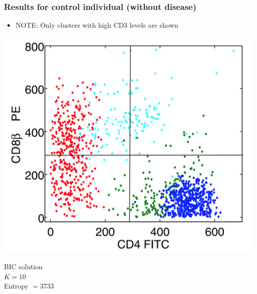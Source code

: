 \documentclass[mathserif,compress]{beamer}
\renewcommand\;{\,}
\begin{document}
\begin{frame}\frametitle{Results for control individual (without disease)}
\begin{itemize}
\medskip
\item[]
\alert{NOTE}: Only clusters with high CD3 levels are shown
\end{itemize}
\begin{center}
\begin{minipage}{0.4\linewidth}
\includegraphics[width=\linewidth]{BIC_control.png}
\begin{center}
BIC solution
\\
$K = 10$
\\
Entropy $ = 3733$
\end{center}
\end{minipage}
\hfill
{}
\end{center}
\end{frame}
\end{document}
